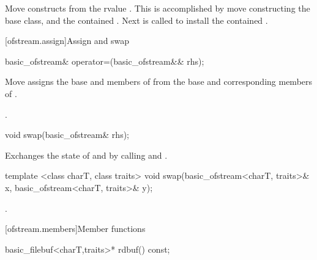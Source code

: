\begin{itemdescr}
\pnum
\effects Move constructs from the rvalue . This
is accomplished by move constructing the base class, and the contained
. Next
 is called to install
the contained .
\end{itemdescr}

[ofstream.assign]{Assign and swap}

%
%
\begin{itemdecl}
basic_ofstream& operator=(basic_ofstream&& rhs);
\end{itemdecl}

\begin{itemdescr}
\pnum
\effects Move assigns the base and members of  from the base and corresponding
members of .

\pnum
\returns {}.
\end{itemdescr}

%
%
\begin{itemdecl}
void swap(basic_ofstream& rhs);
\end{itemdecl}

\begin{itemdescr}
\pnum
\effects Exchanges the state of 
and  by calling
 and
.
\end{itemdescr}

%
%
\begin{itemdecl}
template <class charT, class traits>
void swap(basic_ofstream<charT, traits>& x,
          basic_ofstream<charT, traits>& y);
\end{itemdecl}

\begin{itemdescr}
\pnum
\effects {}.
\end{itemdescr}

[ofstream.members]{Member functions}

%
\begin{itemdecl}
basic_filebuf<charT,traits>* rdbuf() const;
\end{itemdecl}

